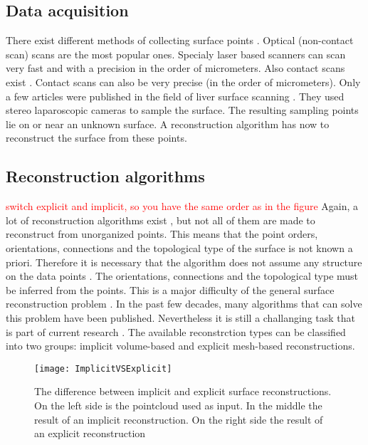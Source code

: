 \subsection{Data acquisition}
There exist different methods of collecting surface points
\cite{franca20053d}\cite{levoy2000digital}\cite{cui20113d}\cite{chu2002infrared}\cite{dou20153d}.
Optical (non-contact scan) scans are the most popular ones. Specialy laser based
scanners can scan very fast and with a precision in the order of micrometers. Also contact scans exist
\cite{pai2001scanning}. Contact scans can also be very precise (in the order of
micrometers).
Only a few articles were published in the field of liver surface scanning \cite{maier2014comparative} \cite{thompson2015accuracy}. 
They used stereo laparoscopic cameras to sample the surface.
The resulting sampling points lie on or near an unknown surface. A
reconstruction algorithm has now to reconstruct the surface from these points.
\subsection{Reconstruction algorithms}
\textcolor{red}{ switch explicit and implicit, so you have the same order as in the figure}
Again, a lot of reconstruction algorithms exist \cite{lim2014surface}, but not
all of them are made to reconstruct from unorganized points. This means
that the point orders, orientations, connections and the topological type of the
surface is not known a priori. Therefore it is necessary that the algorithm does not assume any structure
on the data points \cite{hornung2006robust} \cite{yu1999surface}. The orientations, connections and the topological
type must be inferred from the points. This is a major difficulty of the general surface
reconstruction problem \cite{hoppe1992surface}. In the past few decades, many
algorithms that can solve this problem have been published. Nevertheless it is
still a challanging task that is part of current research \cite{li2018surface}.
The available reconstrction types can be classified into two groups: implicit
volume-based and explicit mesh-based reconstructions.
\begin{figure}[H]
  \centering
 \texttt{[image: ImplicitVSExplicit]}
 \caption{The difference between implicit and explicit surface reconstructions.
   On the left side is the pointcloud used as input. In the middle the result of an
   implicit reconstruction. On the right side the result of an explicit
   reconstruction \cite{stanfordPP}}
  \label{fig:ImplicitVSExplicit}
\end{figure}
